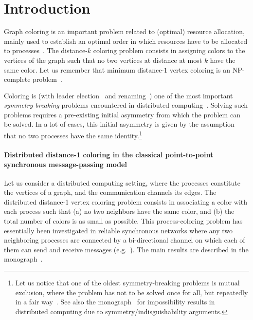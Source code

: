 \documentclass[11pt,english]{article}
\newcommand{\df}[1]{}\newcommand{\ccolor}{{\sc color}\xspace}
\begin{document}
\thispagestyle{empty}
\newpage
\setcounter{page}{1}


\section{Introduction}
Graph coloring is an important problem related to (optimal) resource
allocation, mainly used to establish an optimal order in which
resources have to be allocated to processes~\cite{DKR82,L81}.  The
distance-$k$ coloring problem consists in assigning colors to the
vertices of the graph such that no two vertices at distance at most
$k$ have the same color. Let us remember that minimum distance-$1$
vertex coloring is an NP-complete problem~\cite{GJ79}.



Coloring is (with leader election~\cite{A81} and
renaming~\cite{ABDPR90,CRR11}) one of the most important {\it symmetry
  breaking} problems encountered in distributed
computing~\cite{IRR10}. Solving such problems requires\df{I removed
  ``a seed''. It struck me as odd. But add it back if it's commonly
  used with this meaning.}  a pre-existing initial asymmetry from which
the problem can be solved. In a lot of cases, this initial asymmetry
is given by the assumption that no two processes have the same
identity.\footnote{Let us notice that one of the oldest
  symmetry-breaking problems is mutual exclusion, where the problem
  has not to be solved once for all, but repeatedly in a fair
  way~\cite{R86}.  See also the monograph~\cite{AE14} for
  impossibility results in distributed computing due to
  symmetry/indisguishability arguments.}




\paragraph{Distributed distance-1 coloring in the classical point-to-point
synchronous message-passing model}
Let us consider a distributed computing setting, where the processes
constitute the vertices of a graph, and the communication channels its
edges. The distributed distance-1 vertex coloring problem consists in
associating a color with each process such that (a) no two neighbors
have the same color, and (b) the total number of colors is as small as
possible. This process-coloring problem has essentially been
investigated in reliable synchronous networks where any two
neighboring processes are connected by a bi-directional channel on
which each of them can send and receive messages
(e.g.~\cite{P00,R10,R13,S07}).  The main results are described in the
monograph~\cite{BE14}.  
\end{document}
